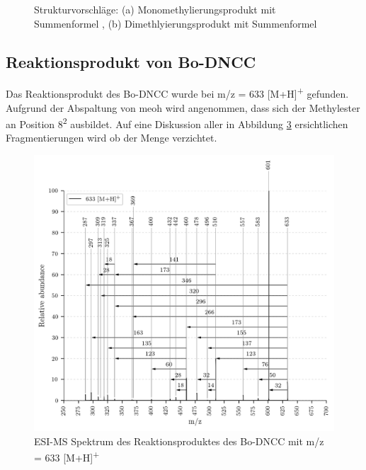 \begin{figure}[!htbp]
\begin{subfigure}[b]{0.5\textwidth}
    \caption{}
    \label{fig:645MHStruktur}
  \end{subfigure}
  \caption[Strukturvorschläge für das Mono- und Dimethylierungsprodukt des Bo-DYCC, Quelle: Autor]{Strukturvorschläge: (a) Monomethylierungsprodukt mit Summenformel , (b) Dimethlyierungsprodukt mit Summenformel }
\end{figure}

\subsection{Reaktionsprodukt von Bo-DNCC}

Das Reaktionsprodukt des Bo-DNCC wurde bei m/z = 633 [M+H]\textsuperscript{+} gefunden. Aufgrund der Abspaltung von \gls{meoh} wird angenommen, dass sich der Methylester an Position 8\textsuperscript{2} ausbildet. Auf eine Diskussion aller in Abbildung \ref{fig:633MH} ersichtlichen Fragmentierungen wird ob der Menge verzichtet.

\begin{figure}[!htbp]
  \centering
  \includegraphics[width=\textwidth, height=0.7\textwidth]{figures/Kapitel7/Kataboliten/VWA_MS_633.png}
  \caption[ESI-MS Spektrum des Reaktionsproduktes von Bo-DNCC, Quelle: Autor]{ESI-MS Spektrum des Reaktionsproduktes des Bo-DNCC mit m/z = 633 [M+H]\textsuperscript{+}}
  \label{fig:633MH}
\end{figure}

